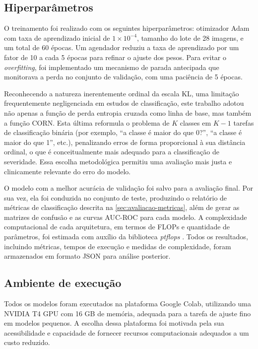 \subsection{Hiperparâmetros}

O treinamento foi realizado com os seguintes hiperparâmetros: otimizador Adam com taxa de aprendizado inicial de $1 \times 10^{-4}$, tamanho do lote de 28 imagens, e um total de 60 épocas. Um agendador reduziu a taxa de aprendizado por um fator de 10 a cada 5 épocas para refinar o ajuste dos pesos. Para evitar o \textit{overfitting}, foi implementado um mecanismo de parada antecipada que monitorava a perda no conjunto de validação, com uma paciência de 5 épocas.

Reconhecendo a natureza inerentemente ordinal da escala KL, uma limitação frequentemente negligenciada em estudos de classificação, este trabalho adotou não apenas a função de perda entropia cruzada como linha de base, mas também a função CORN. Esta última reformula o problema de $K$ classes em $K-1$ tarefas de classificação binária (por exemplo, ``a classe é maior do que 0?'', ``a classe é maior do que 1'', etc.), penalizando erros de forma proporcional à sua distância ordinal, o que é conceitualmente mais adequado para a classificação de severidade. Essa escolha metodológica permitiu uma avaliação mais justa e clinicamente relevante do erro do modelo.

O modelo com a melhor acurácia de validação foi salvo para a avaliação final. Por sua vez, ela foi conduzida no conjunto de teste, produzindo o relatório de métricas de classificação descrita na \autoref{sec:avaliacao-metricas}, além de gerar as matrizes de confusão e as curvas AUC-ROC para cada modelo. A complexidade computacional de cada arquitetura, em termos de FLOPs e quantidade de parâmetros, foi estimada com auxílio da biblioteca \textit{ptflops} \cite{ptflops}. Todos os resultados, incluindo métricas, tempos de execução e medidas de complexidade, foram armazenados em formato JSON para análise posterior.

\subsection{Ambiente de execução}

Todos os modelos foram executados na plataforma Google Colab, utilizando uma NVIDIA T4 GPU com 16 GB de memória, adequada para a tarefa de ajuste fino em modelos pequenos. A escolha dessa plataforma foi motivada pela sua acessibilidade e capacidade de fornecer recursos computacionais adequados a um custo reduzido.

